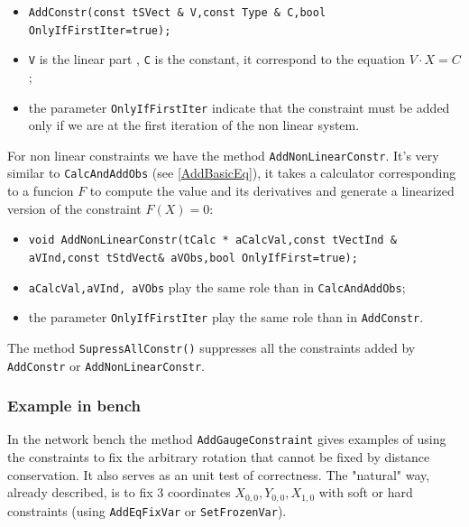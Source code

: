 \begin{itemize}
    \item {\tt AddConstr(const tSVect \& V,const Type \& C,bool OnlyIfFirstIter=true);}
    \item  {\tt V} is the linear part , {\tt C} is the constant, it correspond to the equation $ V \cdot X = C$ ;
    \item  the parameter {\tt  OnlyIfFirstIter} indicate that the constraint must be added only if we are at the
           first iteration of the non linear system.
\end{itemize}

For non linear constraints we have the method {\tt AddNonLinearConstr}.  It's very similar to {\tt CalcAndAddObs}
(see \ref{AddBasicEq}), it takes a calculator corresponding to a funcion $F$ to compute the value 
and its derivatives and generate a linearized version of the constraint $F(X)=0$:

\begin{itemize}
    \item {\tt  void AddNonLinearConstr(tCalc * aCalcVal,const tVectInd \& aVInd,const tStdVect\& aVObs,bool  OnlyIfFirst=true);}

    \item  {\tt aCalcVal,aVInd, aVObs} play the same role than  in {\tt CalcAndAddObs};

    \item  the parameter {\tt  OnlyIfFirstIter} play the same role than in {\tt AddConstr}. 
\end{itemize}

The method {\tt SupressAllConstr()} suppresses all the constraints
added by {\tt AddConstr}  or {\tt AddNonLinearConstr}.


\subsubsection{Example in bench}

In the network bench the method {\tt AddGaugeConstraint} gives examples of using 
the constraints to fix the arbitrary rotation that cannot be fixed by distance conservation.
It also serves as an unit test of correctness.  The "natural" way, already described, is to fix
$3$ coordinates $X_{0,0},Y_{0,0},X_{1,0}$ with soft or hard constraints (using  {\tt AddEqFixVar} or  {\tt SetFrozenVar}).

